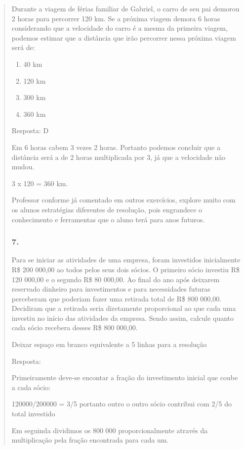 \begin{enumerate}
\begin{escolha}
\begin{enumerate}
\begin{itemize}
\begin{itemize}
\begin{escolha}
\begin{quote}
\begin{escolha}
{Durante a viagem de férias familiar de Gabriel, o carro de seu pai
demorou 2 horas para percorrer 120 km. Se a próxima viagem demora 6
horas considerando que a velocidade do carro é a mesma da primeira
viagem, podemos estimar que a distância que irão percorrer nessa próxima
viagem será de:

\begin{enumerate}
\def\labelenumi{\alph{enumi})}
\item
  40 km
\item
  120 km
\item
  300 km
\item
  360 km
\end{enumerate}

Resposta: D

Em 6 horas cabem 3 vezes 2 horas. Portanto podemos concluir que a
distância será a de 2 horas multiplicada por 3, já que a velocidade não
mudou.

3 x 120 = 360 km.

Professor conforme já comentado em outros exercícios, explore muito com
os alunos estratégias diferentes de resolução, pois engrandece o
conhecimento e ferramentas que o aluno terá para anos futuros.

\subsubsection{7.}\label{section-123}

Para se iniciar as atividades de uma empresa, foram investidos
inicialmente R\$ 200 000,00 ao todos pelos seus dois sócios. O primeiro
sócio investiu R\$ 120 000,00 e o segundo R\$ 80 000,00. Ao final do ano
após deixarem reservado dinheiro para investimentos e para necessidades
futuras perceberam que poderiam fazer uma retirada total de R\$ 800
000,00. Decidiram que a retirada seria diretamente proporcional ao que
cada uma investiu no início das atividades da empresa. Sendo assim,
calcule quanto cada sócio recebera desses R\$ 800 000,00.

Deixar espaço em branco equivalente a 5 linhas para a resolução

Resposta:

Primeiramente deve-se encontar a fração do investimento inicial que
coube a cada sócio:

120000/200000 = 3/5 portanto outro o outro sócio contribui com 2/5 do
total investido

Em seguinda dividimos os 800 000 proporcionalmente através da
multiplicação pela fração encontrada para cada um.

}
\end{escolha}
\end{quote}
\end{escolha}
\end{itemize}
\end{itemize}
\end{enumerate}
\end{escolha}
\end{enumerate}
